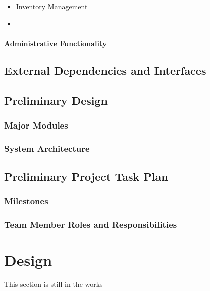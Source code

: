 \documentclass{book}
\begin{document}
\begin{itemize}
\item Inventory Management
\item
\end{itemize} 

\subsubsection{Administrative Functionality}

\section{External Dependencies and Interfaces}

\section{Preliminary Design}

\subsection{Major Modules}

\subsection{System Architecture}


\section{Preliminary Project Task Plan}


\subsection{Milestones}

\subsection{Team Member Roles and Responsibilities}


\chapter*{Design}

This section is still in the works
\end{document}
